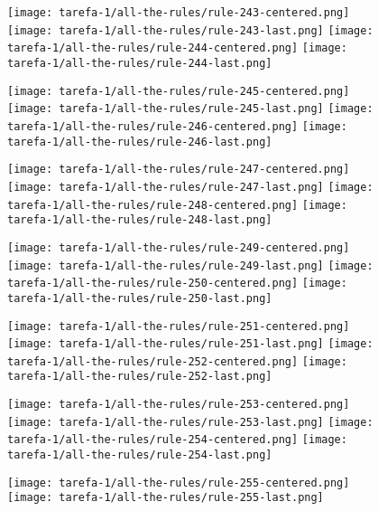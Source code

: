 \begin{figure}[htbp]
  \centering
\texttt{[image: tarefa-1/all-the-rules/rule-243-centered.png]}
\texttt{[image: tarefa-1/all-the-rules/rule-243-last.png]}
\texttt{[image: tarefa-1/all-the-rules/rule-244-centered.png]}
\texttt{[image: tarefa-1/all-the-rules/rule-244-last.png]}
\end{figure}
\begin{figure}[htbp]
  \centering
\texttt{[image: tarefa-1/all-the-rules/rule-245-centered.png]}
\texttt{[image: tarefa-1/all-the-rules/rule-245-last.png]}
\texttt{[image: tarefa-1/all-the-rules/rule-246-centered.png]}
\texttt{[image: tarefa-1/all-the-rules/rule-246-last.png]}
\end{figure}
\begin{figure}[htbp]
  \centering
\texttt{[image: tarefa-1/all-the-rules/rule-247-centered.png]}
\texttt{[image: tarefa-1/all-the-rules/rule-247-last.png]}
\texttt{[image: tarefa-1/all-the-rules/rule-248-centered.png]}
\texttt{[image: tarefa-1/all-the-rules/rule-248-last.png]}
\end{figure}
\begin{figure}[htbp]
  \centering
\texttt{[image: tarefa-1/all-the-rules/rule-249-centered.png]}
\texttt{[image: tarefa-1/all-the-rules/rule-249-last.png]}
\texttt{[image: tarefa-1/all-the-rules/rule-250-centered.png]}
\texttt{[image: tarefa-1/all-the-rules/rule-250-last.png]}
\end{figure}
\begin{figure}[htbp]
  \centering
\texttt{[image: tarefa-1/all-the-rules/rule-251-centered.png]}
\texttt{[image: tarefa-1/all-the-rules/rule-251-last.png]}
\texttt{[image: tarefa-1/all-the-rules/rule-252-centered.png]}
\texttt{[image: tarefa-1/all-the-rules/rule-252-last.png]}
\end{figure}
\begin{figure}[htbp]
  \centering
\texttt{[image: tarefa-1/all-the-rules/rule-253-centered.png]}
\texttt{[image: tarefa-1/all-the-rules/rule-253-last.png]}
\texttt{[image: tarefa-1/all-the-rules/rule-254-centered.png]}
\texttt{[image: tarefa-1/all-the-rules/rule-254-last.png]}
\end{figure}
\begin{figure}[htbp]
  \centering
\texttt{[image: tarefa-1/all-the-rules/rule-255-centered.png]}
\texttt{[image: tarefa-1/all-the-rules/rule-255-last.png]}

\end{figure}


